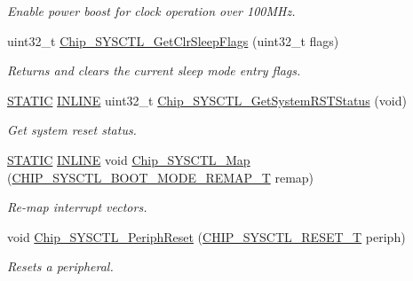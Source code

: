\begin{DoxyCompactItemize}
\begin{DoxyCompactList}\small\item\em Enable power boost for clock operation over 100\+M\+Hz. \end{DoxyCompactList}\item 
uint32\+\_\+t \hyperlink{group__SYSCTL__17XX__40XX_gab80482c3d12f51ef87131497cb67a326}{Chip\+\_\+\+S\+Y\+S\+C\+T\+L\+\_\+\+Get\+Clr\+Sleep\+Flags} (uint32\+\_\+t flags)
\begin{DoxyCompactList}\small\item\em Returns and clears the current sleep mode entry flags. \end{DoxyCompactList}\item 
\hyperlink{group__LPC__Types__Public__Macros_ga10b2d890d871e1489bb02b7e70d9bdfb}{S\+T\+A\+T\+IC} \hyperlink{group__LPC__Types__Public__Types_ga2eb6f9e0395b47b8d5e3eeae4fe0c116}{I\+N\+L\+I\+NE} uint32\+\_\+t \hyperlink{group__SYSCTL__17XX__40XX_gadd10c121cb32ddc55dd62e13de780c59}{Chip\+\_\+\+S\+Y\+S\+C\+T\+L\+\_\+\+Get\+System\+R\+S\+T\+Status} (void)
\begin{DoxyCompactList}\small\item\em Get system reset status. \end{DoxyCompactList}\item 
\hyperlink{group__LPC__Types__Public__Macros_ga10b2d890d871e1489bb02b7e70d9bdfb}{S\+T\+A\+T\+IC} \hyperlink{group__LPC__Types__Public__Types_ga2eb6f9e0395b47b8d5e3eeae4fe0c116}{I\+N\+L\+I\+NE} void \hyperlink{group__SYSCTL__17XX__40XX_gab44b1cefe990081961a517994babfcbd}{Chip\+\_\+\+S\+Y\+S\+C\+T\+L\+\_\+\+Map} (\hyperlink{group__SYSCTL__17XX__40XX_gaacc03dffa90a522f3fc992e9940d196e}{C\+H\+I\+P\+\_\+\+S\+Y\+S\+C\+T\+L\+\_\+\+B\+O\+O\+T\+\_\+\+M\+O\+D\+E\+\_\+\+R\+E\+M\+A\+P\+\_\+T} remap)
\begin{DoxyCompactList}\small\item\em Re-\/map interrupt vectors. \end{DoxyCompactList}\item 
void \hyperlink{group__SYSCTL__17XX__40XX_ga94ee3796eba43742e11809eacb88269b}{Chip\+\_\+\+S\+Y\+S\+C\+T\+L\+\_\+\+Periph\+Reset} (\hyperlink{group__SYSCTL__17XX__40XX_gaecf57441c240b2e654da2a7de6da0f7b}{C\+H\+I\+P\+\_\+\+S\+Y\+S\+C\+T\+L\+\_\+\+R\+E\+S\+E\+T\+\_\+T} periph)
\begin{DoxyCompactList}\small\item\em Resets a peripheral. \end{DoxyCompactList}\item 

\end{DoxyCompactItemize}
